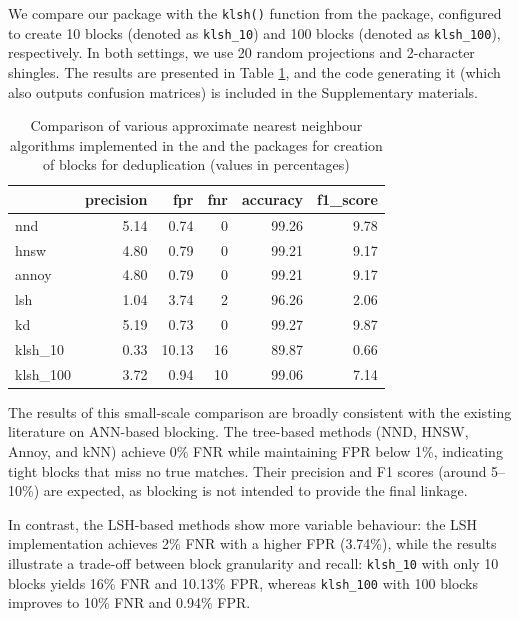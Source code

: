 We compare our package with the \texttt{klsh()} function from the
 package, configured to create 10 blocks (denoted as
\texttt{klsh\_10}) and 100 blocks (denoted as \texttt{klsh\_100}), respectively. In both
settings, we use 20 random projections and 2-character shingles. The
results are presented in Table
\ref{tab:table-latex},
and the code generating it (which also outputs confusion matrices) is
included in the Supplementary materials.

\begin{table}

\caption{\label{tab:table-latex}Comparison of various approximate nearest neighbour algorithms implemented in the  and the  packages for creation of blocks for deduplication (values in percentages)}
\centering
\begin{tabular}[t]{l|r|r|r|r|r}
\hline
  & precision & fpr & fnr & accuracy & f1\_score\\
\hline
nnd & 5.14 & 0.74 & 0 & 99.26 & 9.78\\
\hline
hnsw & 4.80 & 0.79 & 0 & 99.21 & 9.17\\
\hline
annoy & 4.80 & 0.79 & 0 & 99.21 & 9.17\\
\hline
lsh & 1.04 & 3.74 & 2 & 96.26 & 2.06\\
\hline
kd & 5.19 & 0.73 & 0 & 99.27 & 9.87\\
\hline
klsh\_10 & 0.33 & 10.13 & 16 & 89.87 & 0.66\\
\hline
klsh\_100 & 3.72 & 0.94 & 10 & 99.06 & 7.14\\
\hline
\end{tabular}
\end{table}

The results of this small-scale comparison are broadly consistent with the existing literature on ANN-based blocking. The tree-based methods (NND, HNSW, Annoy, and kNN) achieve 0\% FNR while maintaining FPR below 1\%, indicating tight blocks that miss no true matches. Their precision and F1 scores (around 5--10\%) are expected, as blocking is not intended to provide the final linkage.

In contrast, the LSH-based methods show more variable behaviour: the  LSH implementation achieves 2\% FNR with a higher FPR (3.74\%), while the  results illustrate a trade-off between block granularity and recall: \texttt{klsh\_10} with only 10 blocks yields 16\% FNR and 10.13\% FPR, whereas \texttt{klsh\_100} with 100 blocks improves to 10\% FNR and 0.94\% FPR.

